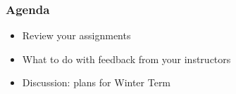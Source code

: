 \documentclass[12pt,article,oneside]{memoir}
\begin{document}
\subsubsection{Agenda}
\begin{itemize}
\item Review your assignments
\item What to do with feedback from your instructors
\item Discussion: plans for Winter Term
\end{itemize}



\newpage
\renewcommand{\bibname}{Reading list}
{}

\end{document}
